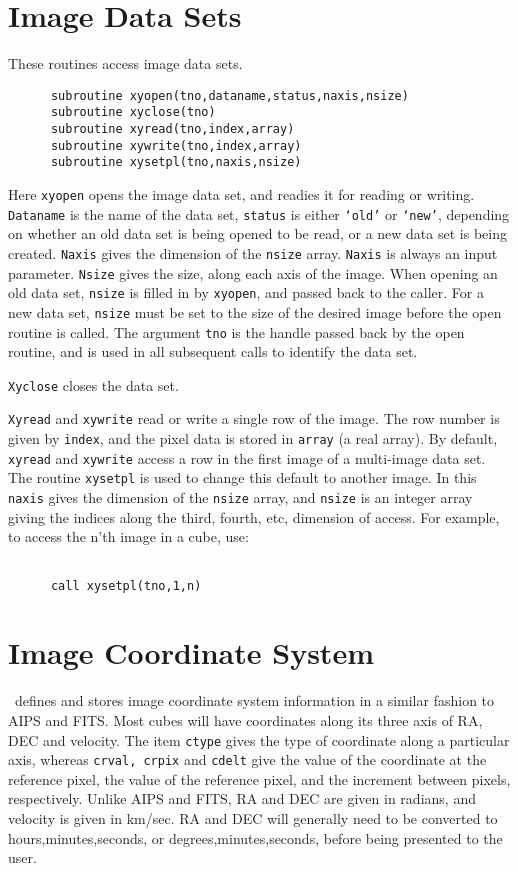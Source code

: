 \section{Image Data Sets}
These routines access image data sets.
\begin{verbatim}
      subroutine xyopen(tno,dataname,status,naxis,nsize)
      subroutine xyclose(tno)
      subroutine xyread(tno,index,array)
      subroutine xywrite(tno,index,array)
      subroutine xysetpl(tno,naxis,nsize)
\end{verbatim}
Here {\tt xyopen} opens the image data set, and readies it for reading or
writing. {\tt Dataname} is the name of the data set, {\tt status} is either
{\tt `old'} or {\tt `new'}, depending on whether an old data set is being opened
to be read, or a new data set is being created. {\tt Naxis} gives the dimension
of the {\tt nsize} array. {\tt Naxis} is always an input parameter.
{\tt Nsize} gives the size, along each axis of the
image. When opening an old data set, {\tt nsize} is filled in by {\tt xyopen},
and passed back to the caller. For a new data set, {\tt nsize} must be set to the
size of the desired image before the open routine is called. The argument
{\tt tno} is the handle passed back by the open routine, and is used
in all subsequent calls to identify the data set.

{\tt Xyclose} closes the data set.

{\tt Xyread} and {\tt xywrite} read or write a single row of the image. 
The row number is given by {\tt index}, and the pixel data is stored in
{\tt array} (a real array). By default, {\tt xyread} and {\tt xywrite} access
a row in the first image of a multi-image data set. The routine {\tt xysetpl}
is used to change this default to another image. In this {\tt naxis} gives the
dimension of the {\tt nsize} array, and {\tt nsize} is an integer array
giving the indices along the third, fourth, etc, dimension of access. For
example, to access the n'th image in a cube, use:
\begin{verbatim}

      call xysetpl(tno,1,n)

\end{verbatim}

\section{Image Coordinate System}
\miriad\ defines and stores image coordinate system information in a similar
fashion to AIPS and FITS. Most cubes will have coordinates along its three
axis of RA, DEC and velocity. The item {\tt ctype} gives the
type of coordinate along a particular axis, whereas {\tt crval, crpix} and
{\tt cdelt} give the value of the coordinate at the reference pixel, the
value of the reference pixel, and the increment between pixels, respectively.
Unlike AIPS and FITS, RA and DEC are given in radians, and velocity is given
in km/sec. RA and DEC will generally need to be converted to
hours,minutes,seconds, or degrees,minutes,seconds, before being presented
to the user.


